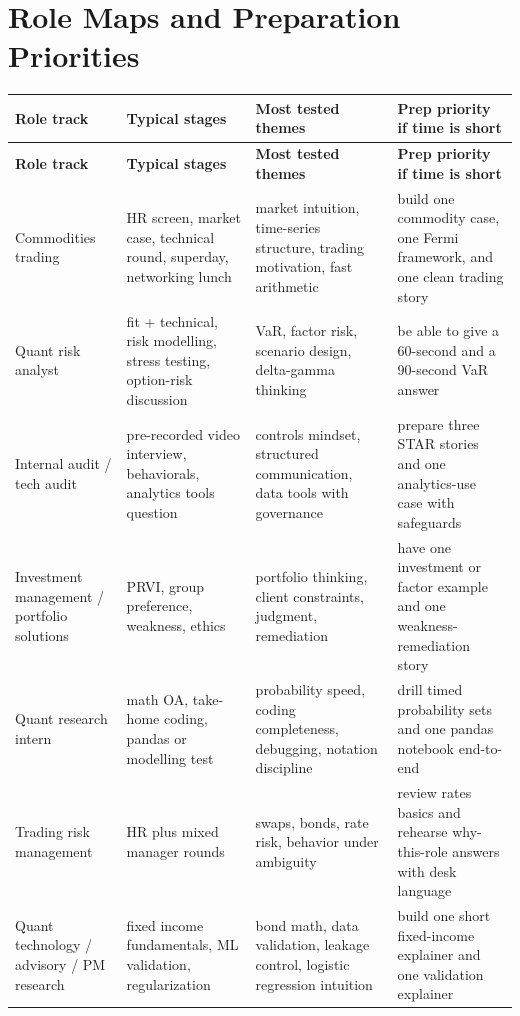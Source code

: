 \documentclass[11pt,letterpaper,openany]{book}
\begin{document}
\section{Role Maps and Preparation Priorities}
\begin{longtable}{@{}p{}p{}p{}p{}@{}}
\toprule
\textbf{Role track} & \textbf{Typical stages} & \textbf{Most tested themes} & \textbf{Prep priority if time is short}\\
\midrule
\endfirsthead
\toprule
\textbf{Role track} & \textbf{Typical stages} & \textbf{Most tested themes} & \textbf{Prep priority if time is short}\\
\midrule
\endhead
\bottomrule
\endfoot
Commodities trading & HR screen, market case, technical round, superday, networking lunch & market intuition, time-series structure, trading motivation, fast arithmetic & build one commodity case, one Fermi framework, and one clean trading story\\
Quant risk analyst & fit + technical, risk modelling, stress testing, option-risk discussion & VaR, factor risk, scenario design, delta-gamma thinking & be able to give a 60-second and a 90-second VaR answer\\
Internal audit / tech audit & pre-recorded video interview, behaviorals, analytics tools question & controls mindset, structured communication, data tools with governance & prepare three STAR stories and one analytics-use case with safeguards\\
Investment management / portfolio solutions & PRVI, group preference, weakness, ethics & portfolio thinking, client constraints, judgment, remediation & have one investment or factor example and one weakness-remediation story\\
Quant research intern & math OA, take-home coding, pandas or modelling test & probability speed, coding completeness, debugging, notation discipline & drill timed probability sets and one pandas notebook end-to-end\\
Trading risk management & HR plus mixed manager rounds & swaps, bonds, rate risk, behavior under ambiguity & review rates basics and rehearse why-this-role answers with desk language\\
Quant technology / advisory / PM research & fixed income fundamentals, ML validation, regularization & bond math, data validation, leakage control, logistic regression intuition & build one short fixed-income explainer and one validation explainer\\
\end{longtable}
\end{document}
